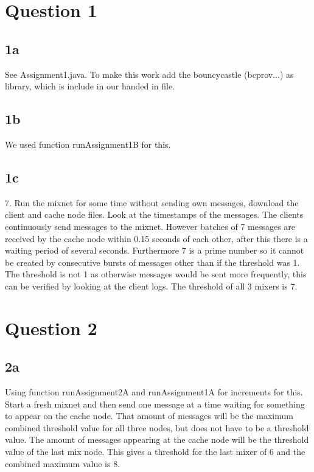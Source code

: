 \documentclass{article}
\begin{document}
\section{Question 1}
\subsection{1a}
 See Assignment1.java. To make this work add the bouncycastle (bcprov...) as library, which is include in our handed in file.
\subsection{1b}
 We used function runAssignment1B for this.
\subsection{1c}
7. Run the mixnet for some time without sending own messages, download the client and cache node files. Look at the timestamps of the messages. The clients continuously send messages to the mixnet. However batches of 7 messages are received by the cache node within 0.15 seconds of each other, after this there is a waiting period of several seconds. Furthermore 7 is a prime number so it cannot be created by consecutive bursts of messages other than if the threshold was 1. The threshold is not 1 as otherwise messages would be sent more frequently, this can be verified by looking at the client logs. The threshold of all 3 mixers is 7.

\section{Question 2}
\subsection{2a}
Using function runAssignment2A and runAssignment1A for increments for this. \\

Start a fresh mixnet and then send one message at a time waiting for something to appear on the cache node. That amount of messages will be the maximum combined threshold value for all three nodes, but does not have to be a threshold value. The amount of messages appearing at the cache node will be the threshold value of the last mix node.
This gives a threshold for the last mixer of 6 and the combined maximum value is 8.
\end{document}
